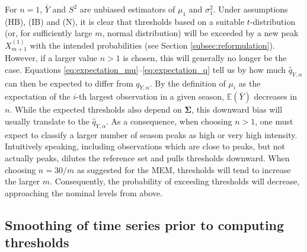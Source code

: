 \documentclass[12pt]{article}
\begin{document}
For $n = 1$, $\bar{Y}$ and $S^2$ are unbiased estimators of $\mu_1$ and $\sigma^2_1$. Under assumptions (HB), (IB) and (N), it is clear that thresholds based on a suitable $t$-distribution (or, for sufficiently large $m$, normal distribution) will be exceeded by a new peak $X_{m + 1}^{(1)}$ with the intended probabilities (see Section \ref{subsec:reformulation}).
However, if a larger value $n > 1$ is chosen, this will generally no longer be the case. Equations \eqref{eq:expectation_mu}--\eqref{eq:expectation_q} tell us by how much $\hat{q}_{Y, \alpha}$ can then be expected to differ from $q_{Y, \alpha}$. By the definition of $\mu_i$ as the expectation of the $i$-th largest observation in a given season, $\mathbb{E}(\bar{Y})$ decreases in $n$. While the expected thresholds also depend on $\mathbf{\Sigma}$, this downward bias will usually translate to the $\hat{q}_{Y, \alpha}$. As a consequence, when choosing $n > 1$, one must expect to classify a larger number of season peaks as high or very high intensity. Intuitively speaking, including observations which are close to peaks, but not actually peaks, dilutes the reference set and pulls thresholds downward. When choosing $n = 30/m$ as suggested for the MEM, thresholds will tend to increase the larger $m$. Consequently, the probability of exceeding thresholds will decrease, approaching the nominal levels from above. 




\subsection{Smoothing of time series prior to computing thresholds}
\label{subsec:smoothing}
\end{document}
